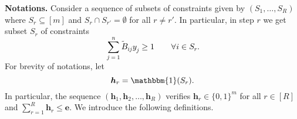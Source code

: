 \documentclass[moor]{informs1}              %
\newcommand{\mb}[1]{\ensuremath{\boldsymbol{#1}}}
\newcommand*{\red}{\textcolor{black}}
\begin{document}
\vspace{2mm}
\noindent
{\bf Notations.}
Consider a sequence of subsets of constraints given by $(S_1,\ldots,S_R)$ where $S_r \subseteq [m]$ and $S_r \cap S_{r'} = \emptyset$ for all $r\neq r'$. In particular, in step $r$ we get subset $S_r$ of constraints
\red{$$  \sum_{j=1}^n \tilde{B}_{ij} y_j \geq 1 \qquad \forall i \in S_r.$$}
For brevity of notations, let $$\mb h_r = \mathbbm{1}(S_r).$$
In particular, the sequence $( \mb h_1, \mb h_2,\ldots, \mb h_R)$ verifies $\mb h_r\in \{0,1\}^m$ for all $ r \in [R]$ and  $\sum_{r=1}^R \mb h_r \leq \mb e.$
 We introduce the following definitions.
\end{document}
